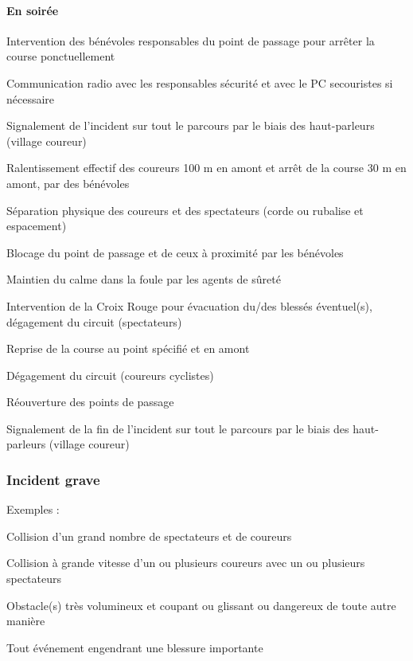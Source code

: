 \documentclass[hidelinks, paper=a4, fontsize=13pt]{report}
\begin{document}
\paragraph{En soirée}
\begin{list}{•}{}
\item Intervention des bénévoles responsables du point de passage pour arrêter la course ponctuellement 
\item Communication radio avec les responsables sécurité et avec le PC secouristes si nécessaire
\item Signalement de l’incident sur tout le parcours par le biais des haut-parleurs (village coureur)
\item Ralentissement effectif des coureurs 100 m en amont et arrêt de la course 30 m en amont, par des bénévoles
\item Séparation physique des coureurs et des spectateurs (corde ou rubalise et espacement)
\item Blocage du point de passage et de ceux à proximité par les bénévoles
\item Maintien du calme dans la foule par les agents de sûreté
\item Intervention de la Croix Rouge pour évacuation du/des blessés éventuel(s), dégagement du circuit (spectateurs)
\item Reprise de la course au point spécifié et en amont
\item Dégagement du circuit (coureurs cyclistes)
\item Réouverture des points de passage
\item Signalement de la fin de l’incident sur tout le parcours par le biais des haut-parleurs (village coureur)
\end{list}


\subsubsection{Incident grave}

Exemples :
\begin{list}{•}{}
\item Collision d’un grand nombre de spectateurs et de coureurs
\item Collision à grande vitesse d’un ou plusieurs coureurs avec un ou plusieurs spectateurs
\item Obstacle(s) très volumineux et coupant ou glissant ou dangereux de toute autre manière
\item Tout événement engendrant une blessure importante
\end{list}
\end{document}
